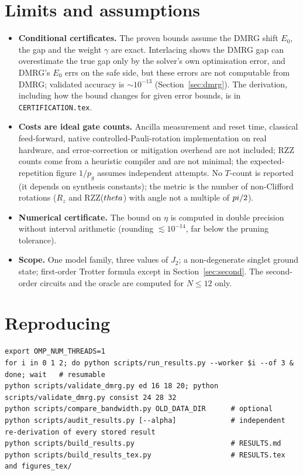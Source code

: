\documentclass[11pt]{article}
\begin{document}
\section{Limits and assumptions}\label{sec:limits}
\begin{itemize}
\item \textbf{Conditional certificates.} The proven bounds assume the DMRG shift $E_0$, the gap and the weight $\gamma$ are exact. Interlacing shows the DMRG gap can overestimate the true gap only by the solver's own optimisation error, and DMRG's $E_0$ errs on the safe side, but these errors are not computable from DMRG; validated accuracy is $\sim10^{-13}$ (Section~\ref{sec:dmrg}). The derivation, including how the bound changes for given error bounds, is in \texttt{CERTIFICATION.tex}.
\item \textbf{Costs are ideal gate counts.} Ancilla measurement and reset time, classical feed-forward, native controlled-Pauli-rotation implementation on real hardware, and error-correction or mitigation overhead are not included; RZZ counts come from a heuristic compiler and are not minimal; the expected-repetition figure $1/p_g$ assumes independent attempts. No $T$-count is reported (it depends on synthesis constants); the metric is the number of non-Clifford rotations ($R_z$ and RZZ($\\theta$) with angle not a multiple of $\\pi/2$).
\item \textbf{Numerical certificate.} The bound on $\eta$ is computed in double precision without interval arithmetic (rounding $\lesssim10^{-14}$, far below the pruning tolerance).
\item \textbf{Scope.} One model family, three values of $J_2$; a non-degenerate singlet ground state; first-order Trotter formula except in Section~\ref{sec:second}. The second-order circuits and the oracle are computed for $N\leq12$ only.
\end{itemize}

\section{Reproducing}
\begin{verbatim}
export OMP_NUM_THREADS=1
for i in 0 1 2; do python scripts/run_results.py --worker $i --of 3 & done; wait   # resumable
python scripts/validate_dmrg.py ed 16 18 20; python scripts/validate_dmrg.py consist 24 28 32
python scripts/compare_bandwidth.py OLD_DATA_DIR      # optional
python scripts/audit_results.py [--alpha]             # independent re-derivation of every stored result
python scripts/build_results.py                       # RESULTS.md
python scripts/build_results_tex.py                   # RESULTS.tex and figures_tex/
\end{verbatim}
\end{document}
